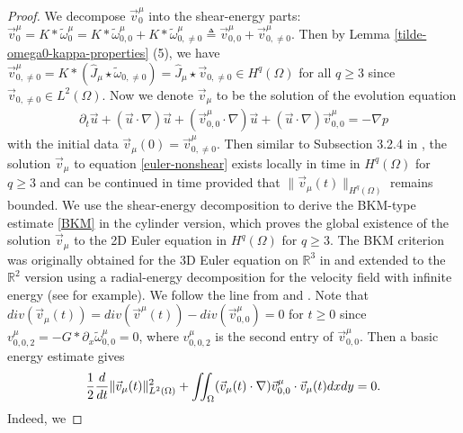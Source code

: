 \documentclass[1 [leqno, 11pt]{amsart}
\numberwithin{equation}{section}
\begin{document}
\begin{CJK*}{GBK}{song}
\begin{appendix}
\begin{proof}
We decompose $\vec{v}_{0}^{\mu}$ into the shear-energy parts: $\vec{v}_{0}^{\mu}=K\ast\tilde\omega_0^{\mu}=K\ast\tilde\omega_{0,0}^{\mu}+K\ast\tilde\omega_{0,\neq0}^{\mu}\triangleq\vec{v}_{0,0}^{\mu}+\vec{v}_{0,\neq0}^{\mu}$. Then
by Lemma \ref{tilde-omega0-kappa-properties} (5), we have $\vec{v}_{0,\neq0}^{\mu}=K\ast(\hat J_{\mu}\star\tilde\omega_{0,\neq0})=\hat J_{\mu}\star\vec{v}_{0,\neq0}\in H^q(\Omega)$ for all $q\geq3$ since $\vec{v}_{0,\neq0}\in L^2(\Omega)$.
Now we denote $\vec{v}_{\mu}$ to be the solution of the evolution equation
\begin{align}\label{euler-nonshear}
 \partial_t\vec{u}+(\vec{u}\cdot\nabla)\vec{u}+(\vec{v}_{0,0}^{\mu}\cdot\nabla)\vec{u}+(\vec{u}\cdot\nabla)\vec{v}_{0,0}^{\mu}=-\nabla p
 \end{align}
with the initial data
$\vec{v}_{\mu}(0)=\vec{v}_{0,\neq0}^{\mu}$.  Then similar to Subsection 3.2.4 in \cite{Majda-Bertozzi02}, the  solution $\vec{v}_{\mu}$ to equation \eqref{euler-nonshear} exists locally in time in $H^q(\Omega)$ for $q\geq3$ and can be continued in time provided that $\|\vec{v}_{\mu}(t)\|_{H^q(\Omega)}$ remains bounded.
We use the shear-energy decomposition to derive  the BKM-type estimate  \eqref{BKM} in the cylinder version,
which proves the global existence  of the  solution $\vec{v}_{\mu}$ to the 2D Euler equation in $H^q(\Omega)$ for $q\geq3$.
The BKM criterion was originally  obtained for the 3D Euler equation on  $\mathbb{R}^3$  in
\cite{BKM84} and extended to the $\mathbb{R}^2$ version using a radial-energy decomposition for the velocity field with infinite energy (see \cite{Majda-Bertozzi02} for example). We follow the line from \cite{Majda-Bertozzi02} and \cite{Kato1986nonlinear}.
Note that  $div(\vec{v}_{\mu}(t))=div(\vec{v}^{\mu}(t))-div(\vec{v}_{0,0}^{\mu})=0$ for $t\geq0$ since
${v}_{0,0,2}^{\mu}=- G\ast\partial_x \tilde\omega_{0,0}^{\mu}=0$, where ${v}_{0,0,2}^{\mu}$ is the second entry of $\vec{v}_{0,0}^{\mu}$. Then a basic energy estimate gives
\begin{align*}
{1\over 2} {d\over dt}\|\vec{v}_{\mu}(t)\|_{L^2(\Omega)}^2+\iint_{\Omega}(\vec{v}_{\mu}(t)\cdot\nabla)\vec{v}_{0,0}^{\mu}\cdot\vec{v}_{\mu}(t)dxdy=0.
 \end{align*}
Indeed, we

\end{proof}
\end{appendix}
\end{CJK*}
\end{document}
